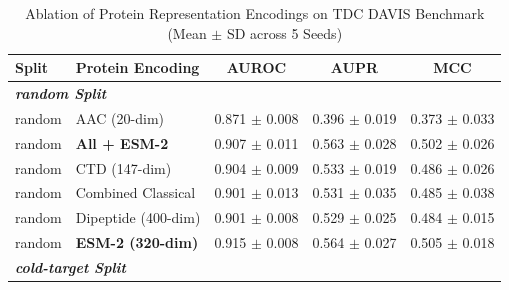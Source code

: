\begin{table}[t]
\centering
\caption{Ablation of Protein Representation Encodings on TDC DAVIS Benchmark (Mean $\pm$ SD across 5 Seeds)}\n\label{tab:dti_protein_ablation}
\small
\begin{tabular}{llccc}
\hline
\textbf{Split} & \textbf{Protein Encoding} & \textbf{AUROC} & \textbf{AUPR} & \textbf{MCC} \\
\hline
\multicolumn{5}{l}{\textit{\textbf{random Split}}} \\
\hline
random & AAC (20-dim) & 0.871 $\pm$ 0.008 & 0.396 $\pm$ 0.019 & 0.373 $\pm$ 0.033 \\
random & \textbf{All + ESM-2} & 0.907 $\pm$ 0.011 & 0.563 $\pm$ 0.028 & 0.502 $\pm$ 0.026 \\
random & CTD (147-dim) & 0.904 $\pm$ 0.009 & 0.533 $\pm$ 0.019 & 0.486 $\pm$ 0.026 \\
random & Combined Classical & 0.901 $\pm$ 0.013 & 0.531 $\pm$ 0.035 & 0.485 $\pm$ 0.038 \\
random & Dipeptide (400-dim) & 0.901 $\pm$ 0.008 & 0.529 $\pm$ 0.025 & 0.484 $\pm$ 0.015 \\
random & \textbf{ESM-2 (320-dim)} & 0.915 $\pm$ 0.008 & 0.564 $\pm$ 0.027 & 0.505 $\pm$ 0.018 \\
\hline
\multicolumn{5}{l}{\textit{\textbf{cold-target Split}}} \\
\hline
\hline
\end{tabular}
\end{table}
